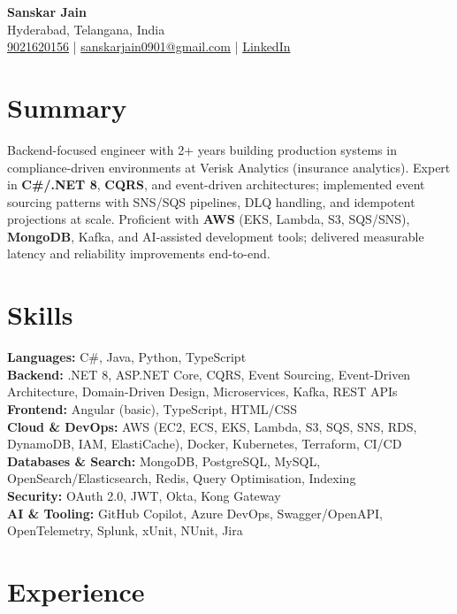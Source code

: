 \documentclass[letterpaper,10pt]{article}
\begin{document}
\begin{center}
    {\LARGE \textbf{Sanskar Jain}} \\
    Hyderabad, Telangana, India \\
    \href{tel:9021620156}{9021620156} \;|\;
    \href{mailto:sanskarjain0901@gmail.com}{sanskarjain0901@gmail.com} \;|\;
    \href{https://www.linkedin.com/in/sanskar-jain0901/}{LinkedIn}
\end{center}

\vspace{3pt}

\section*{Summary}
Backend-focused engineer with 2+ years building production systems in compliance-driven environments at Verisk Analytics (insurance analytics).
Expert in \textbf{C\#/.NET 8}, \textbf{CQRS}, and event-driven architectures; implemented event sourcing patterns with SNS/SQS pipelines, DLQ handling, and idempotent projections at scale.
Proficient with \textbf{AWS} (EKS, Lambda, S3, SQS/SNS), \textbf{MongoDB}, Kafka, and AI-assisted development tools; delivered measurable latency and reliability improvements end-to-end.

\section*{Skills}
\textbf{Languages:} C\#, Java, Python, TypeScript \\
\textbf{Backend:} .NET 8, ASP.NET Core, CQRS, Event Sourcing, Event-Driven Architecture, Domain-Driven Design, Microservices, Kafka, REST APIs \\
\textbf{Frontend:} Angular (basic), TypeScript, HTML/CSS \\
\textbf{Cloud \& DevOps:} AWS (EC2, ECS, EKS, Lambda, S3, SQS, SNS, RDS, DynamoDB, IAM, ElastiCache), Docker, Kubernetes, Terraform, CI/CD \\
\textbf{Databases \& Search:} MongoDB, PostgreSQL, MySQL, OpenSearch/Elasticsearch, Redis, Query Optimisation, Indexing \\
\textbf{Security:} OAuth 2.0, JWT, Okta, Kong Gateway \\
\textbf{AI \& Tooling:} GitHub Copilot, Azure DevOps, Swagger/OpenAPI, OpenTelemetry, Splunk, xUnit, NUnit, Jira

\section*{Experience}
\end{document}
